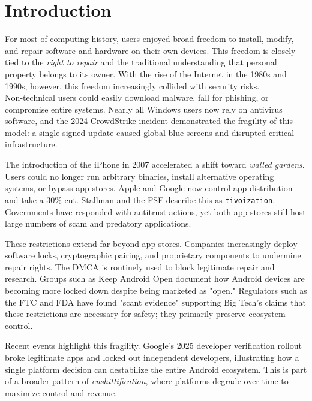 \section{Introduction}
\label{sec:intro}

For most of computing history, users enjoyed broad freedom to install, modify, and repair software and hardware on their own devices. This freedom is closely tied to the \textit{right to repair} and the traditional understanding that personal property belongs to its owner. With the rise of the Internet in the 1980s and 1990s, however, this freedom increasingly collided with security risks. Non‑technical users could easily download malware\cite{microsoftPreventMalware}, fall for phishing\cite{microsoftPhishingTrends}, or compromise entire systems. Nearly all Windows users now rely on antivirus software, and the 2024 CrowdStrike incident demonstrated the fragility of this model: a single signed update caused global blue screens and disrupted critical infrastructure\cite{wikipedia2024crowdstrike}.

The introduction of the iPhone in 2007 accelerated a shift toward \textit{walled gardens}. Users could no longer run arbitrary binaries, install alternative operating systems, or bypass app stores\cite{apple2021trusted, melontini2025bootloader}. Apple and Google now control app distribution and take a 30\% cut\cite{FreeBSDfan2024, haney2023users}. Stallman and the FSF describe this as \texttt{tivoization}\cite{GNUtivoization}. Governments have responded with antitrust actions\cite{usdoj2024apple,europa2024apple,samr2025google}, yet both app stores still host large numbers of scam and predatory applications\cite{10.1145/3548606.3560615, 10.1145/2484313.2484316}.

These restrictions extend far beyond app stores. Companies increasingly deploy software locks, cryptographic pairing, and proprietary components to undermine repair rights. The DMCA is routinely used to block legitimate repair and research\cite{greengardfightingrighttorepair2025}. Groups such as Keep Android Open\cite{keepandroidopen} document how Android devices are becoming more locked down despite being marketed as "open." Regulators such as the FTC and FDA have found "scant evidence" supporting Big Tech’s claims that these restrictions are necessary for safety; they primarily preserve ecosystem control\cite{nixingthefix}.

Recent events highlight this fragility. Google's 2025 developer verification\cite{keepandroidopen} rollout broke legitimate apps and locked out independent developers, illustrating how a single platform decision can destabilize the entire Android ecosystem. This is part of a broader pattern of \textit{enshittification}\cite{doctorow2025enshittification}, where platforms degrade over time to maximize control and revenue.

